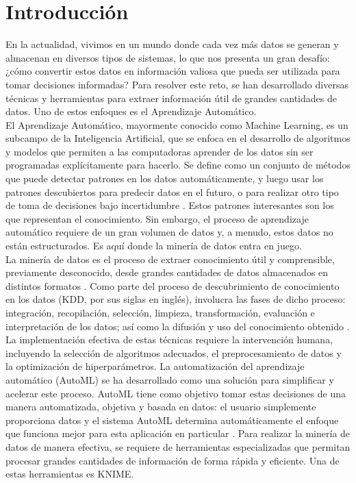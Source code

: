 \chapter*{Introducción}
En la actualidad, vivimos en un mundo donde cada vez más datos se generan y almacenan en diversos tipos de sistemas, lo que nos presenta un gran desafío: ¿cómo convertir estos datos en información valiosa que pueda ser utilizada para tomar decisiones informadas? Para resolver este reto, se han desarrollado diversas técnicas y herramientas para extraer información útil de grandes cantidades de datos. Uno de estos enfoques es el Aprendizaje Automático. \\
El Aprendizaje Automático, mayormente conocido como Machine Learning, es un subcampo de la Inteligencia Artificial, que se enfoca en el desarrollo de algoritmos y modelos que permiten a las computadoras aprender de los datos sin ser programadas explícitamente para hacerlo. Se define como un conjunto de métodos que puede detectar patrones en los datos automáticamente, y luego usar los patrones descubiertos para predecir datos en el futuro, o para realizar otro tipo de toma de decisiones bajo incertidumbre \citep{murphy2012machine}. Estos patrones interesantes son los que representan el conocimiento.  Sin embargo, el proceso de aprendizaje automático requiere de un gran volumen de datos y, a menudo, estos datos no están estructurados. Es aquí donde la minería de datos entra en juego.\\
La minería de datos es el proceso de extraer conocimiento útil y comprensible, previamente desconocido, desde grandes cantidades de datos almacenados en distintos formatos \citep{orallo2004}. Como parte del proceso de descubrimiento de conocimiento en los datos (KDD, por sus siglas en inglés), involucra las fases de dicho proceso: integración, recopilación, selección, limpieza, transformación, evaluación e interpretación de los datos; así como la difusión y uso del conocimiento obtenido \citep{Han2011}.  \\
La implementación efectiva de estas técnicas requiere la intervención humana, incluyendo la selección de algoritmos adecuados, el preprocesamiento de datos y la optimización de hiperparámetros. La automatización del aprendizaje automático (AutoML) se ha desarrollado como una solución para simplificar y acelerar este proceso. AutoML tiene como objetivo tomar estas decisiones de una manera automatizada, objetiva y basada en datos: el usuario simplemente proporciona datos y el sistema AutoML determina automáticamente el enfoque que funciona mejor para esta aplicación en particular \citep{hutter2019automated}. Para realizar la minería de datos de manera efectiva, se requiere de herramientas especializadas que permitan procesar grandes cantidades de información de forma rápida y eficiente. Una de estas herramientas es KNIME.\\
